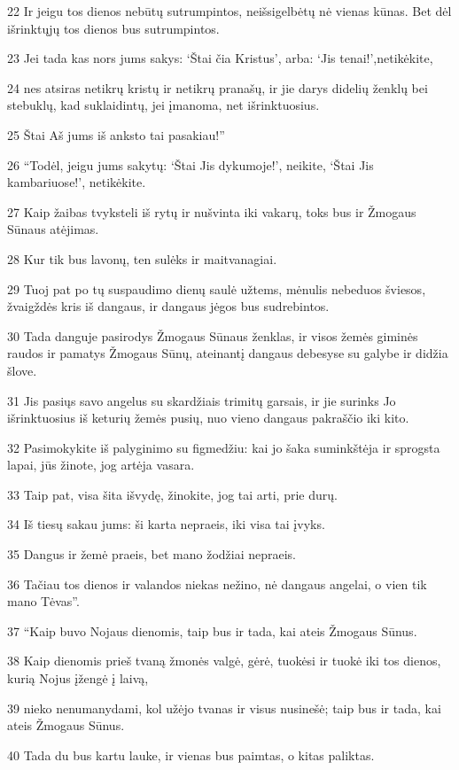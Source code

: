 \par 22 Ir jeigu tos dienos nebūtų sutrumpintos, neišsigelbėtų nė vienas kūnas. Bet dėl išrinktųjų tos dienos bus sutrumpintos. 
\par 23 Jei tada kas nors jums sakys: ‘Štai čia Kristus’, arba: ‘Jis tenai!’,­netikėkite, 
\par 24 nes atsiras netikrų kristų ir netikrų pranašų, ir jie darys didelių ženklų bei stebuklų, kad suklaidintų, jei įmanoma, net išrinktuosius. 
\par 25 Štai Aš jums iš anksto tai pasakiau!” 
\par 26 “Todėl, jeigu jums sakytų: ‘Štai Jis dykumoje!’, neikite, ‘Štai Jis kambariuose!’, netikėkite. 
\par 27 Kaip žaibas tvyksteli iš rytų ir nušvinta iki vakarų, toks bus ir Žmogaus Sūnaus atėjimas. 
\par 28 Kur tik bus lavonų, ten sulėks ir maitvanagiai. 
\par 29 Tuoj pat po tų suspaudimo dienų saulė užtems, mėnulis nebeduos šviesos, žvaigždės kris iš dangaus, ir dangaus jėgos bus sudrebintos. 
\par 30 Tada danguje pasirodys Žmogaus Sūnaus ženklas, ir visos žemės giminės raudos ir pamatys Žmogaus Sūnų, ateinantį dangaus debesyse su galybe ir didžia šlove. 
\par 31 Jis pasiųs savo angelus su skardžiais trimitų garsais, ir jie surinks Jo išrinktuosius iš keturių žemės pusių, nuo vieno dangaus pakraščio iki kito. 
\par 32 Pasimokykite iš palyginimo su figmedžiu: kai jo šaka suminkštėja ir sprogsta lapai, jūs žinote, jog artėja vasara. 
\par 33 Taip pat, visa šita išvydę, žinokite, jog tai arti, prie durų. 
\par 34 Iš tiesų sakau jums: ši karta nepraeis, iki visa tai įvyks. 
\par 35 Dangus ir žemė praeis, bet mano žodžiai nepraeis. 
\par 36 Tačiau tos dienos ir valandos niekas nežino, nė dangaus angelai, o vien tik mano Tėvas”. 
\par 37 “Kaip buvo Nojaus dienomis, taip bus ir tada, kai ateis Žmogaus Sūnus. 
\par 38 Kaip dienomis prieš tvaną žmonės valgė, gėrė, tuokėsi ir tuokė iki tos dienos, kurią Nojus įžengė į laivą, 
\par 39 nieko nenumanydami, kol užėjo tvanas ir visus nusinešė; taip bus ir tada, kai ateis Žmogaus Sūnus. 
\par 40 Tada du bus kartu lauke, ir vienas bus paimtas, o kitas paliktas. 
